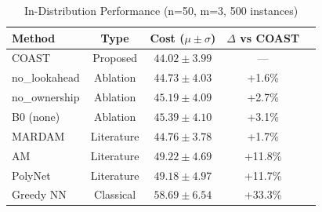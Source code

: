 \begin{table}[t]
\centering\caption{In-Distribution Performance (n=50, m=3, 500 instances)}\label{tab:main}
\begin{tabular}{lcccc}\toprule
Method & Type & Cost ($\mu\pm\sigma$) & $\Delta$ vs COAST \\ \midrule
COAST & Proposed & $44.02\pm3.99$ & --- \\
no\_lookahead & Ablation & $44.73\pm4.03$ & +1.6\% \\
no\_ownership & Ablation & $45.19\pm4.09$ & +2.7\% \\
B0 (none) & Ablation & $45.39\pm4.10$ & +3.1\% \\
MARDAM & Literature & $44.76\pm3.78$ & +1.7\% \\
AM & Literature & $49.22\pm4.69$ & +11.8\% \\
PolyNet & Literature & $49.18\pm4.97$ & +11.7\% \\
Greedy NN & Classical & $58.69\pm6.54$ & +33.3\% \\ \bottomrule
\end{tabular}\end{table}